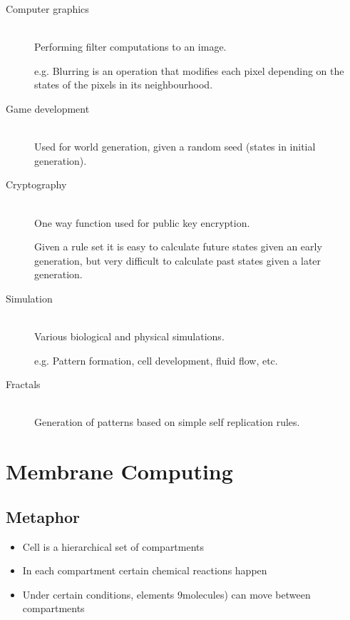 \documentclass[a4paper]{article}
\begin{document}
\begin{description}
  \item[Computer graphics] \hfill \\
    Performing filter computations to an image.

    e.g. Blurring is an operation that modifies each pixel depending on the
    states of the pixels in its neighbourhood.

  \item[Game development] \hfill \\
    Used for world generation, given a random seed (states in initial
    generation).

  \item[Cryptography] \hfill \\
    One way function used for public key encryption.

    Given a rule set it is easy to calculate future states given an early
    generation, but very difficult to calculate past states given a later
    generation.

  \item[Simulation] \hfill \\
    Various biological and physical simulations.

    e.g. Pattern formation, cell development, fluid flow, etc.

  \item[Fractals] \hfill \\
    Generation of patterns based on simple self replication rules.

\end{description}

\section{Membrane Computing}
\label{sec:membrane}

\subsection{Metaphor}

\begin{itemize}
  \item Cell is a hierarchical set of compartments
  \item In each compartment certain chemical reactions happen
  \item Under certain conditions, elements 9molecules) can move between
        compartments
\end{itemize}
\end{document}
